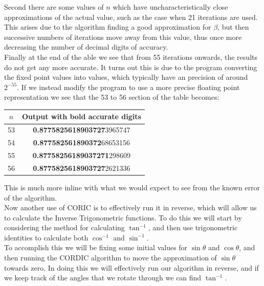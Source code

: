 {Second there are some values of \(n\) which have uncharacteristically close approximations of the actual value, such as the case when 21 iterations are used. This arises due to the algorithm finding a good approximation for \(\beta\), but then successive numbers of iterations move away from this value, thus once more decreasing the number of decimal digits of accuracy.\\

Finally at the end of the able we see that from 55 iterations onwards, the results do not get any more accurate. It turns out this is due to the program converting the  fixed point values into  values, which typically have an precision of around \(2^{-55}\). If we instead modify the program to use a more precise floating point representation we see that the 53 to 56 section of the table becomes:

{\selectfont
\begin{center}
\begin{tabular}{|c|c|}
	\hline
	\(n\) & \textsf{Output with bold accurate digits}\\\hline
	53 & \textbf{0.8775825618903727}3965747\\\hline
	54 & \textbf{0.877582561890372}68653156\\\hline
	55 & \textbf{0.87758256189037271}298609\\\hline
	56 & \textbf{0.8775825618903727}2621336\\\hline
\end{tabular}
\end{center}}

This is much more inline with what we would expect to see from the known error of the algorithm.\\

Now another use of CORIC is to effectively run it in reverse, which will allow us to calculate the Inverse Trigonometric functions. To do this we will start by considering the method for calculating \(\tan^{-1}\), and then use trigonometric identities to calculate both \(\cos^{-1}\) and \(\sin^{-1}\).\\

To accomplish this we will be fixing some initial values for \(\sin\theta\) and \(\cos\theta\), and then running the CORDIC algorithm to move the approximation of \(\sin\theta\) towards zero. In doing this we will effectively run our algorithm in reverse, and if we keep track of the angles that we rotate through we can find \(\tan^{-1}\).\\

}
